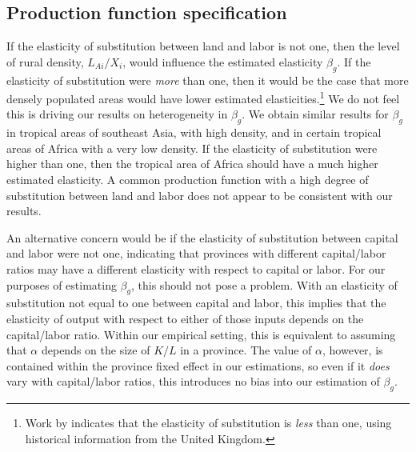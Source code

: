 \documentclass[11pt]{article}
\begin{document}
\subsection{Production function specification}
If the elasticity of substitution between land and labor is not one, then the level of rural density, $L_{Ai}/X_i$, would influence the estimated elasticity $\beta_g$. If the elasticity of substitution were \textit{more} than one, then it would be the case that more densely populated areas would have lower estimated elasticities.\footnote{Work by \citet{wilde2012} indicates that the elasticity of substitution is \textit{less} than one, using historical information from the United Kingdom.} We do not feel this is driving our results on heterogeneity in $\beta_g$. We obtain similar results for $\beta_g$ in tropical areas of southeast Asia, with high density, and in certain tropical areas of Africa with a very low density. If the elasticity of substitution were higher than one, then the tropical area of Africa should have a much higher estimated elasticity. A common production function with a high degree of substitution between land and labor does not appear to be consistent with our results.

An alternative concern would be if the elasticity of substitution between capital and labor were not one, indicating that provinces with different capital/labor ratios may have a different elasticity with respect to capital or labor. For our purposes of estimating $\beta_g$, this should not pose a problem. With an elasticity of substitution not equal to one between capital and labor, this implies that the elasticity of output with respect to either of those inputs depends on the capital/labor ratio. Within our empirical setting, this is equivalent to assuming that $\alpha$ depends on the size of $K/L$ in a province. The value of $\alpha$, however, is contained within the province fixed effect in our estimations, so even if it \textit{does} vary with capital/labor ratios, this introduces no bias into our estimation of $\beta_g$.
\end{document}
